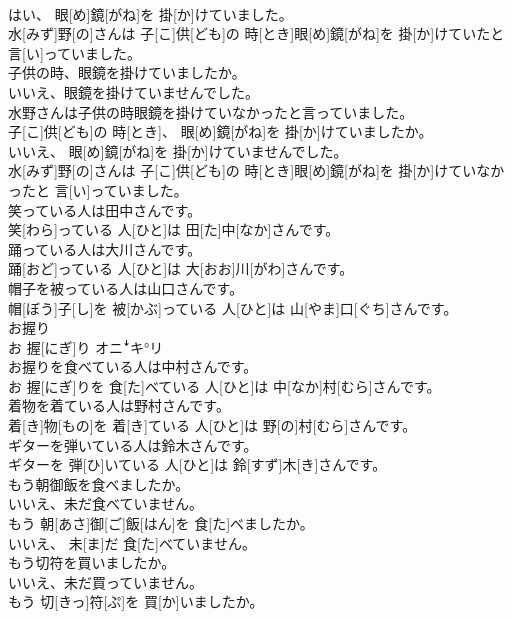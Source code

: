 \documentclass[8pt]{extreport}
\begin{document}
\begin{CJK}{UTF8}{min}
\\	はい、 眼[め]鏡[がね]を 掛[か]けていました。 
\\	水[みず]野[の]さんは 子[こ]供[ども]の 時[とき]眼[め]鏡[がね]を 掛[か]けていたと 言[い]っていました。
\\	子供の時、眼鏡を掛けていましたか。 
\\	いいえ、眼鏡を掛けていませんでした。 
\\	水野さんは子供の時眼鏡を掛けていなかったと言っていました。	
\\	子[こ]供[ども]の 時[とき]、 眼[め]鏡[がね]を 掛[か]けていましたか。 
\\	いいえ、 眼[め]鏡[がね]を 掛[か]けていませんでした。 
\\	水[みず]野[の]さんは 子[こ]供[ども]の 時[とき]眼[め]鏡[がね]を 掛[か]けていなかったと 言[い]っていました。
\\	笑っている人は田中さんです。	
\\	笑[わら]っている 人[ひと]は 田[た]中[なか]さんです。
\\	踊っている人は大川さんです。	
\\	踊[おど]っている 人[ひと]は 大[おお]川[がわ]さんです。
\\	帽子を被っている人は山口さんです。	
\\	帽[ぼう]子[し]を 被[かぶ]っている 人[ひと]は 山[やま]口[ぐち]さんです。
\\	お握り	
\\	お 握[にぎ]り	オニꜜキ°リ
\\	お握りを食べている人は中村さんです。	
\\	お 握[にぎ]りを 食[た]べている 人[ひと]は 中[なか]村[むら]さんです。
\\	着物を着ている人は野村さんです。	
\\	着[き]物[もの]を 着[き]ている 人[ひと]は 野[の]村[むら]さんです。
\\	ギターを弾いている人は鈴木さんです。	
\\	ギターを 弾[ひ]いている 人[ひと]は 鈴[すず]木[き]さんです。
\\	もう朝御飯を食べましたか。 
\\	いいえ、未だ食べていません。	
\\	もう 朝[あさ]御[ご]飯[はん]を 食[た]べましたか。 
\\	いいえ、 未[ま]だ 食[た]べていません。
\\	もう切符を買いましたか。 
\\	いいえ、未だ買っていません。	
\\	もう 切[きっ]符[ぷ]を 買[か]いましたか。 

\end{CJK}
\end{document}
